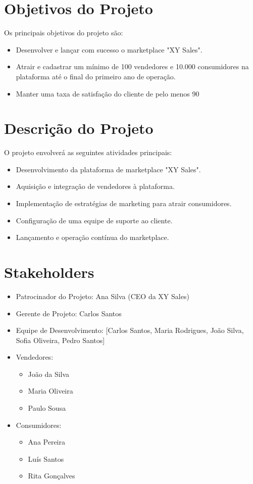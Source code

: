 \documentclass[
	12pt,				%
	openright,			%
	twoside,			%
	a4paper,			%
	english,			%
	brazil				%
	]{abntex2}
\begin{document}
\section{Objetivos do Projeto}
Os principais objetivos do projeto são:
\begin{itemize}
    \item Desenvolver e lançar com sucesso o marketplace "XY Sales".
    \item Atrair e cadastrar um mínimo de 100 vendedores e 10.000 consumidores na plataforma até o final do primeiro ano de operação.
    \item Manter uma taxa de satisfação do cliente de pelo menos 90%
\end{itemize}

\section{Descrição do Projeto}
O projeto envolverá as seguintes atividades principais:
\begin{itemize}
    \item Desenvolvimento da plataforma de marketplace "XY Sales".
    \item Aquisição e integração de vendedores à plataforma.
    \item Implementação de estratégias de marketing para atrair consumidores.
    \item Configuração de uma equipe de suporte ao cliente.
    \item Lançamento e operação contínua do marketplace.
\end{itemize}

\section{Stakeholders}
\begin{itemize}
    \item Patrocinador do Projeto: Ana Silva (CEO da XY Sales)
    \item Gerente de Projeto: Carlos Santos
    \item Equipe de Desenvolvimento: [Carlos Santos, Maria Rodrigues, João Silva, Sofia Oliveira, Pedro Santos]
    \item Vendedores:
    \begin{itemize}
        \item João da Silva
        \item Maria Oliveira
        \item Paulo Sousa
    \end{itemize}
    \item Consumidores:
    \begin{itemize}
        \item Ana Pereira
        \item Luís Santos
        \item Rita Gonçalves
    \end{itemize}
\end{itemize}
\end{document}
